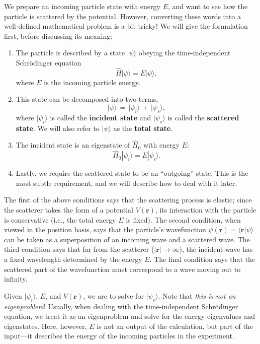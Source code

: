 \documentclass[pra,12pt]{revtex4}
\begin{document}
We prepare an incoming particle state with energy $E$, and want to see
how the particle is scattered by the potential.  However, converting
these words into a well-defined mathematical problem is a bit tricky!
We will give the formulation first, before discussing its meaning:
\begin{enumerate}
\item 
The particle is described by a state $|\psi\rangle$ obeying the
time-independent Schr\"odinger equation
$$\hat{H} |\psi\rangle = E |\psi\rangle,$$
where $E$ is the incoming particle energy.  

\item
This state can be decomposed into two terms,
$$|\psi\rangle \,=\, |\psi_i\rangle \,+\, |\psi_s\rangle,$$
where $|\psi_i\rangle$ is called the \textbf{incident state} and
$|\psi_s\rangle$ is called the \textbf{scattered state}.  We will also
refer to $|\psi\rangle$ as the \textbf{total state}.

\item
The incident state is an eigenstate of $\hat{H}_0$ with energy $E$:
$$\hat{H}_0 |\psi_i\rangle = E |\psi_i\rangle.$$

\item
Lastly, we require the scattered state to be an ``outgoing'' state.
This is the most subtle requirement, and we will describe how to deal
with it later.
\end{enumerate}
The first of the above conditions says that the scattering process is
elastic; since the scatterer takes the form of a potential
$V(\mathbf{r})$, its interaction with the particle is conservative
(i.e., the total energy $E$ is fixed).  The second condition, when
viewed in the position basis, says that the particle's wavefunction
$\psi(\mathbf{r}) = \langle \mathbf{r} |\psi\rangle$ can be taken as a
superposition of an incoming wave and a scattered wave.  The third
condition says that far from the scatterer ($|\mathbf{r}|\rightarrow
\infty$), the incident wave has a fixed wavelength determined by the
energy $E$.  The final condition says that the scattered part of the
wavefunction must correspond to a wave moving out to infinity.

Given $|\psi_i\rangle$, $E$, and $V(\mathbf{r})$, we are to solve for
$|\psi_s\rangle$.  Note that \textit{this is not an eigenproblem}!
Usually, when dealing with the time-independent Schr\"odinger
equation, we treat it as an eigenproblem and solve for the energy
eigenvalues and eigenstates.  Here, however, $E$ is not an output of
the calculation, but part of the input---it describes the energy of
the incoming particles in the experiment.
\end{document}
